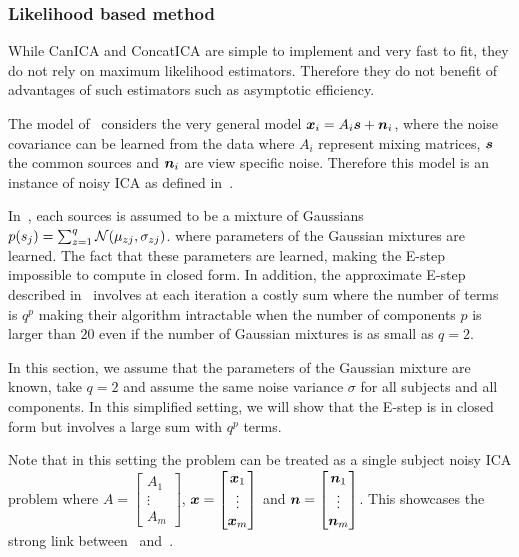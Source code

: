 \subsubsection{Likelihood based method}
\label{sec:guo}
While CanICA and ConcatICA are simple to implement and very fast to fit, they do
not rely on maximum likelihood estimators. Therefore they do not benefit of
advantages of such estimators such as asymptotic efficiency.

The model of~\cite{guo2008unified} considers the very general model $\boldsymbol{x}_i =
A_i\boldsymbol{s} + \boldsymbol{n}_i$, where the noise covariance can be learned from the data where
$A_i$ represent mixing matrices, $\boldsymbol{s}$ the common sources and $\boldsymbol{n}_i$ are view
specific noise. Therefore this model is an instance of noisy ICA as defined in~\cite{hyvarinen1999gaussian}.

In~\cite{guo2008unified}, each sources is assumed to be a mixture of Gaussians
$p(s_j) = \sum_{z=1}^q \mathcal{N}(\mu_{zj}, \sigma_{zj})$.
where parameters of the Gaussian mixtures are learned. The fact that these
parameters are learned, making the E-step impossible to compute in closed form. In
addition, the
approximate E-step described in~\cite{guo2008unified} involves at each iteration
a costly sum where the number of terms is $q^p$ making their algorithm
intractable when the number of components $p$ is larger than $20$ even if the
number of Gaussian mixtures is as small as $q=2$. 

In this section, we assume that the parameters of the Gaussian mixture are
known, take $q=2$ and assume the same noise variance $\sigma$ for all subjects and all
components. In this
simplified setting, we will show that the E-step is in closed form but involves
a large sum with $q^p$ terms.

Note that in this setting the problem can be treated as a single subject noisy
ICA problem where $A = \begin{bmatrix} A_1 \\ \vdots  \\ A_m \end{bmatrix}$,
$\boldsymbol{x} = \begin{bmatrix} \boldsymbol{x}_1 \\ \vdots  \\ \boldsymbol{x}_m \end{bmatrix}$ and $\boldsymbol{n}
= \begin{bmatrix} \boldsymbol{n}_1 \\ \vdots  \\ \boldsymbol{n}_m \end{bmatrix}$. This showcases the
strong link between~\cite{guo2008unified} and~\cite{moulines1997maximum}.

